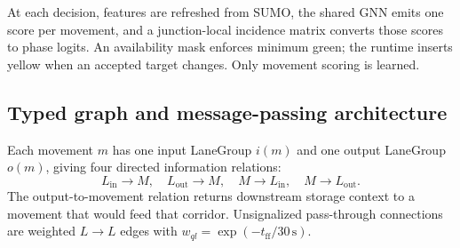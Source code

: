 \documentclass[10pt,a4paper]{article}
\begin{document}
At each decision, features are refreshed from SUMO, the shared GNN emits one score per movement, and a junction-local incidence matrix converts those scores to phase logits.
An availability mask enforces minimum green; the runtime inserts yellow when an accepted target changes.
Only movement scoring is learned.

\subsection{Typed graph and message-passing architecture}

Each movement \(m\) has one input LaneGroup \(i(m)\) and one output LaneGroup \(o(m)\), giving four directed information relations:
\[
L_{\mathrm{in}}\!\rightarrow M,\quad
L_{\mathrm{out}}\!\rightarrow M,\quad
M\!\rightarrow L_{\mathrm{in}},\quad
M\!\rightarrow L_{\mathrm{out}}.
\]
The output-to-movement relation returns downstream storage context to a movement that would feed that corridor.
Unsignalized pass-through connections are weighted \(L\!\rightarrow L\) edges with \(w_{ql}=\exp(-t_{\mathrm{ff}}/30\,\mathrm{s})\).
\end{document}
